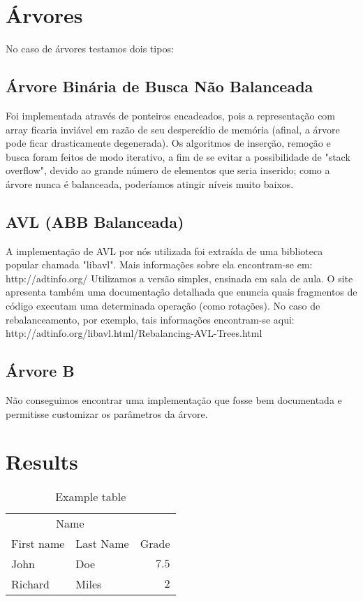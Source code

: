 \documentclass[twoside]{article}
\begin{document}
\begin{multicols}{2}


\section{Árvores}

No caso de árvores testamos dois tipos:
\subsection{ Árvore Binária de Busca Não Balanceada }
   Foi implementada através de ponteiros encadeados, pois a representação com array ficaria inviável em razão de seu despercídio de memória (afinal, a árvore pode ficar drasticamente degenerada). Os algoritmos de inserção, remoção e busca foram feitos de modo iterativo, a fim de se evitar a possibilidade de "stack overflow", devido ao grande número de elementos que seria inserido; como a árvore nunca é balanceada, poderíamos atingir níveis muito baixos.

\subsection{ AVL (ABB Balanceada) }
   A implementação de AVL por nós utilizada foi extraída de uma biblioteca popular chamada "libavl". Mais informações sobre ela encontram-se em: http://adtinfo.org/
   Utilizamos a versão simples, ensinada em sala de aula. O site apresenta também uma documentação detalhada que enuncia quais fragmentos de código executam uma determinada operação (como rotações). No caso de rebalanceamento, por exemplo, tais informações encontram-se aqui: 
   http://adtinfo.org/libavl.html/Rebalancing-AVL-Trees.html

\subsection{ Árvore B }
   Não conseguimos encontrar uma implementação que fosse bem documentada e permitisse customizar os parâmetros da árvore.



\section{Results}

\begin{table}[H]
\caption{Example table}
\centering
\begin{tabular}{llr}
\toprule
\multicolumn{2}{c}{Name} \\
\cmidrule(r){1-2}
First name & Last Name & Grade \\
\midrule
John & Doe & $7.5$ \\
Richard & Miles & $2$ \\
\bottomrule
\end{tabular}
\end{table}


\end{multicols}
\end{document}
